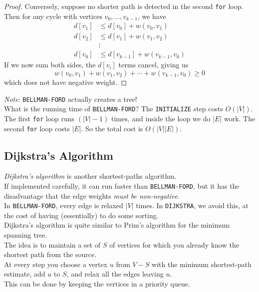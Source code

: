 \documentclass[12pt]{article}
\theoremstyle{plain}
\theoremstyle{definition}
\begin{document}
\begin{proof}
Conversely, suppose no shorter path is detected in the second \texttt{for} loop. \\
Then for any cycle with vertices $v_{0}, \dots, v_{k - 1}$, we have
\begin{align*}
d[v_{1}] &\leq d[v_{0}] + w(v_{0}, v_{1}) \\
d[v_{2}] &\leq d[v_{1}] + w(v_{1}, v_{2}) \\
&\vdots \\
d[v_{0}] &\leq d[v_{k - 1}] + w(v_{k - 1}, v_{0})
\end{align*}
If we now sum both sides, the $d[v_{i}]$ terms cancel, giving us
$$w(v_{0}, v_{1}) + w(v_{1}, v_{2}) + \cdots + w(v_{k - 1}, v_{0}) \geq 0$$
which does not have negative weight.
\end{proof}

\emph{Note}: \texttt{BELLMAN-FORD} actually creates a tree! \\

What is the running time of \texttt{BELLMAN-FORD}?
The \texttt{INITIALIZE} step costs $O(|V|)$.
The first \texttt{for} loop runs $(|V| - 1)$ times, and inside the loop we do $|E|$ work.
The second \texttt{for} loop costs $|E|$.
So the total cost is $O(|V||E|)$.

\subsection{Dijkstra's Algorithm}
\emph{Dijkstra's algorithm} is another shortest-paths algorithm. \\
If implemented carefully, it can run faster than \texttt{BELLMAN-FORD}, but it has the disadvantage that the edge weights \emph{must be non-negative}. \\
In \texttt{BELLMAN-FORD}, every edge is relaxed $|V|$ times.
In \texttt{DIJKSTRA}, we avoid this, at the cost of having (essentially) to do some sorting. \\

Dijkstra's algorithm is quite similar to Prim's algorithm for the minimum spanning tree. \\
The idea is to maintain a set of $S$ of vertices for which you already know the shortest path from the source. \\
At every step you choose a vertex $u$ from $V - S$ with the minimum shortest-path estimate, add $u$ to $S$, and relax all the edges leaving $u$. \\
This can be done by keeping the vertices in a priority queue.
\end{document}
